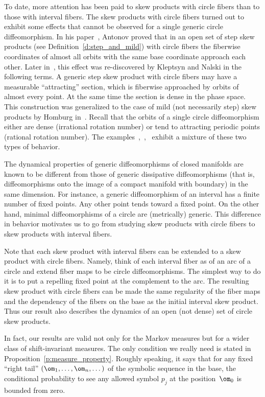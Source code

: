 \documentclass[a4paper,12pt]{amsart}
\begin{document}
To date, more attention has been paid to skew products with circle fibers than to those with interval fibers. The skew products with circle fibers turned out to exhibit some effects that cannot be observed for a single generic circle diffeomorphism. In his paper~\cite{Antonov1984}, Antonov proved that in an open set of step skew products (see Definition~\ref{d:step_and_mild}) with circle fibers the fiberwise coordinates of almost all orbits with the same base coordinate approach each other. Later in~\cite{Kleptsyn2004}, this effect was re-discovered by Kleptsyn and Nalski in the following terms. A generic step skew product with circle fibers may have a measurable ``attracting'' section, which is fiberwise approached by orbits of almost every point. At the same time the section is dense in the phase space. This construction was generalized to the case of mild (not necessarily step) skew products by Homburg in~\cite{Homburg2010}. Recall that the orbits of a single circle diffeomorphism either are dense (irrational rotation number) or tend to attracting periodic points (rational rotation number). The examples~\cite{Antonov1984},~\cite{Kleptsyn2004},~\cite{Homburg2010} exhibit a mixture of these two types of behavior.

The dynamical properties of generic diffeomorphisms of closed manifolds are known to be different from those of generic dissipative diffeomorphisms (that is, diffeomorphisms onto the image of a compact manifold with boundary) in the same dimension. For instance, a generic diffeomorphism of an interval has a finite number of fixed points. Any other point tends toward a fixed point. On the other hand, minimal diffeomorphisms of a circle are (metrically) generic.
This difference in behavior motivates us to go from studying skew products with circle fibers
to skew products with interval fibers.

Note that each skew product with interval fibers can be extended to a skew product with circle fibers. Namely, think of each interval fiber as of an arc of a circle and extend fiber maps to be circle diffeomorphisms. The simplest way to do it is to put a repelling fixed point at the complement to the arc. The resulting skew product with circle fibers can be made the same regularity of the fiber maps and the dependency of the fibers on the base as the initial interval skew product. Thus our result also describes the dynamics of an open (not dense) set of circle skew products.



In fact, our results are valid not only for the Markov measures but for a wider class of shift-invariant measures. The only condition we really need is stated in Proposition~\ref{p:measure_property}. Roughly speaking, it says that for any fixed ``right tail'' $(\om_1, \dots, \om_n, \dots)$ of the symbolic sequence in the base, the conditional probability to see any allowed symbol $p_j$ at the position~$\om_0$ is bounded from zero.
\end{document}
